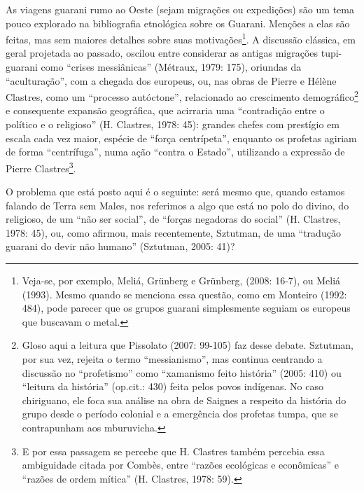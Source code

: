 \documentclass{article}
\begin{document}
As viagens guarani rumo ao Oeste (sejam migra\c{c}\~oes ou
expedi\c{c}\~oes) s\~ao um tema pouco explorado na bibliografia
etnol\'ogica sobre os Guarani. Men\c{c}\~oes a elas s\~ao feitas, mas
sem maiores detalhes sobre suas motiva\c{c}\~oes\footnote{ Veja-se, por
exemplo, Meli\'a, Gr\"unberg e Gr\"unberg, (2008: 16-7), ou Meli\'a
(1993). Mesmo quando se menciona essa quest\~ao, como em Monteiro
(1992: 484), pode parecer que os grupos guarani simplesmente seguiam os
europeus que buscavam o metal. }. A discuss\~ao cl\'assica, em geral
projetada ao passado, oscilou entre considerar as antigas
migra\c{c}\~oes tupi-guarani como {\textquotedblleft}crises
messi\^anicas{\textquotedblright} (M\'etraux, 1979: 175), oriundas da
{\textquotedblleft}acultura\c{c}\~ao{\textquotedblright}, com a chegada
dos europeus, ou, nas obras de Pierre e H\'el\`ene Clastres, como um
{\textquotedblleft}processo aut\'octone{\textquotedblright},
relacionado ao crescimento demogr\'afico\footnote{ Gloso aqui a leitura
que Pissolato (2007: 99-105) faz desse debate. Sztutman, por sua vez,
rejeita o termo {\textquotedblleft}messianismo{\textquotedblright}, mas
continua centrando a discuss\~ao no
{\textquotedblleft}profetismo{\textquotedblright} como
{\textquotedblleft}xamanismo feito hist\'oria{\textquotedblright}
(2005: 410) ou {\textquotedblleft}leitura da
hist\'oria{\textquotedblright} (op.cit.: 430) feita pelos povos
ind\'igenas. No caso chiriguano, ele foca sua an\'alise na obra de
Saignes a respeito da hist\'oria do grupo desde o per\'iodo colonial e
a emerg\^encia dos profetas tumpa, que se contrapunham aos mburuvicha. 
} e consequente expans\~ao geogr\'afica, que acirraria uma
{\textquotedblleft}contradi\c{c}\~ao entre o pol\'itico e o
religioso{\textquotedblright} (H. Clastres, 1978: 45): grandes chefes
com prest\'igio em escala cada vez maior, esp\'ecie de
{\textquotedblleft}for\c{c}a centr\'ipeta{\textquotedblright}, enquanto
os profetas agiriam de forma
{\textquotedblleft}centr\'ifuga{\textquotedblright}, numa a\c{c}\~ao
{\textquotedblleft}contra o Estado{\textquotedblright}, utilizando a
express\~ao de Pierre Clastres\footnote{ E por essa passagem se percebe
que H. Clastres tamb\'em percebia essa ambiguidade citada por Comb\`es,
entre {\textquotedblleft}raz\~oes ecol\'ogicas e
econ\^omicas{\textquotedblright} e {\textquotedblleft}raz\~oes de ordem
m\'itica{\textquotedblright} (H. Clastres, 1978: 59).}.

O problema que est\'a posto aqui \'e o seguinte: ser\'a mesmo que,
quando estamos falando de Terra sem Males, nos referimos a algo que
est\'a no polo do divino, do religioso, de um {\textquotedblleft}n\~ao
ser social{\textquotedblright}, de {\textquotedblleft}for\c{c}as
negadoras do social{\textquotedblright} (H. Clastres, 1978: 45), ou,
como afirmou, mais recentemente, Sztutman, de uma
{\textquotedblleft}tradu\c{c}\~ao guarani do devir n\~ao
humano{\textquotedblright} (Sztutman, 2005: 41)?
\end{document}
